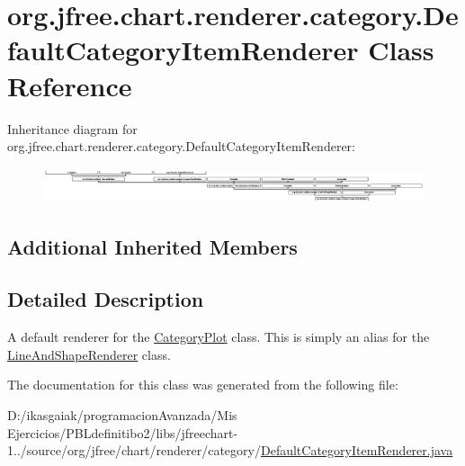 \hypertarget{classorg_1_1jfree_1_1chart_1_1renderer_1_1category_1_1_default_category_item_renderer}{}\section{org.\+jfree.\+chart.\+renderer.\+category.\+Default\+Category\+Item\+Renderer Class Reference}
\label{classorg_1_1jfree_1_1chart_1_1renderer_1_1category_1_1_default_category_item_renderer}
Inheritance diagram for org.\+jfree.\+chart.\+renderer.\+category.\+Default\+Category\+Item\+Renderer\+:\begin{figure}[H]
\begin{center}
\leavevmode
\includegraphics[height=1.030928cm]{classorg_1_1jfree_1_1chart_1_1renderer_1_1category_1_1_default_category_item_renderer}
\end{center}
\end{figure}
\subsection*{Additional Inherited Members}


\subsection{Detailed Description}
A default renderer for the \mbox{\hyperlink{}{Category\+Plot}} class. This is simply an alias for the \mbox{\hyperlink{classorg_1_1jfree_1_1chart_1_1renderer_1_1category_1_1_line_and_shape_renderer}{Line\+And\+Shape\+Renderer}} class. 

The documentation for this class was generated from the following file\+:\begin{DoxyCompactItemize}
\item 
D\+:/ikasgaiak/programacion\+Avanzada/\+Mis Ejercicios/\+P\+B\+Ldefinitibo2/libs/jfreechart-\/1../source/org/jfree/chart/renderer/category/\mbox{\hyperlink{_default_category_item_renderer_8java}{Default\+Category\+Item\+Renderer.\+java}}\end{DoxyCompactItemize}
